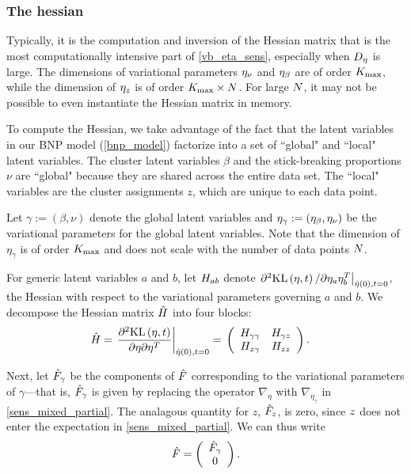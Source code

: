 \subsubsection*{The hessian}

Typically, it is the computation and inversion of the Hessian matrix that is
the most computationally intensive part of \eqref{vb_eta_sens}, especially when
${D_{\eta}}$ is large.
The dimensions of variational parameters $\eta_{\nu}$ and
$\eta_{\beta}$ are of order ${K_{\mathrm{max}}}$,
while the dimension of $\eta_{z}$ is of order ${K_{\mathrm{max}}}
\times N$.
For large $N$, it may not be possible to even instantiate the Hessian matrix in memory.

To compute the Hessian, we take advantage of the fact that the latent variables
in our BNP model (\eqref{bnp_model})
factorize into a set of ``global" and ``local" latent variables.
The cluster latent variables $\beta$ and
the stick-breaking proportions $\nu$
are ``global" because they are shared across the entire data set.
The ``local" variables are the cluster assignments $z$, which are unique to each data point.

Let $\gamma := (\beta, \nu)$ denote the global latent variables and
$\eta_\gamma := (\eta_{\beta}, \eta_{\nu})$ be the variational parameters for the global latent variables.
Note that the dimension of $\eta_\gamma$ is of order ${K_{\mathrm{max}}}$ and does not scale with
the number of data points $N$.

For generic latent variables $a$ and $b$,
let $H_{ab}$ denote $\left.\partial^2 \mathrm{KL}\left(\eta, t\right) / \partial \eta_a
\eta_b^T\right|_{\hat\eta(0), t=0}$, the Hessian with respect to the variational
parameters governing $a$ and $b$.
We decompose the Hessian matrix $\hat{H}$ into four blocks:
%
\begin{align*}
%
\hessopt =
\fracat{\partial^2 \KL{\eta, \t}}
       {\partial \eta \partial \eta^T}
       {\etaopt(0), t= 0} ={}&
\left(
\begin{array}{cc}
   \hess{\gamma\gamma} & \hess{\gamma\z} \\
   \hess{\z\gamma}     & \hess{\z\z} \\
\end{array}
\right).
%
\end{align*}

Next, let $\hat F_\gamma$ be the components of
$\hat F$ corresponding to the variational parameters of
$\gamma$---that is, $\hat F_\gamma$ is given by replacing
the operator $\nabla_\eta$ with $\nabla_{\eta_\gamma}$ in \eqref{sens_mixed_partial}.
The analagous quantity for $z$, $\hat F_z$, is zero, since $z$ does not enter the expectation in \eqref{sens_mixed_partial}.
We can thus write
\begin{align*}
  \hat F = \left( \begin{array}{c} \hat F_\gamma \\ 0 \end{array}\right).
\end{align*}

